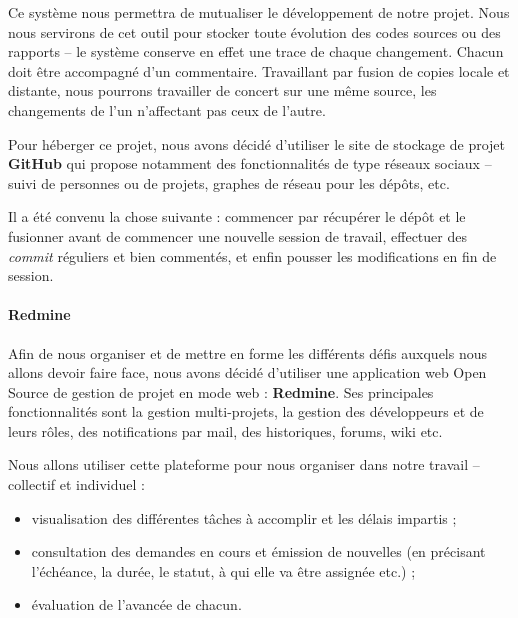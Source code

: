 
Ce système nous permettra de mutualiser le développement de notre projet. Nous nous servirons de cet outil pour stocker toute évolution des codes sources ou des rapports -- le système conserve en effet une trace de chaque changement. Chacun doit être accompagné d'un commentaire. Travaillant par fusion de copies locale et distante, nous pourrons travailler de concert sur une même source, les changements de l'un n'affectant pas ceux de l'autre.

Pour héberger ce projet, nous avons décidé d'utiliser le site de stockage de projet \textbf{GitHub} qui propose notamment des fonctionnalités de type réseaux sociaux -- suivi de personnes ou de projets, graphes de réseau pour les dépôts, etc.

Il a été convenu la chose suivante : commencer par récupérer le dépôt et le fusionner avant de commencer une nouvelle session de travail, effectuer des \textit{commit} réguliers et bien commentés, et enfin pousser les modifications en fin de session.

\paragraph*{Redmine\\}

Afin de nous organiser et de mettre en forme les différents défis auxquels nous allons devoir faire face, nous avons décidé d'utiliser une application web Open Source de gestion de projet en mode web : \textbf{Redmine}. Ses principales fonctionnalités sont la gestion multi-projets, la gestion des développeurs et de leurs rôles, des notifications par mail, des historiques, forums, wiki etc.

Nous allons utiliser cette plateforme pour nous organiser dans notre travail -- collectif et individuel :

\begin{itemize}
  \item visualisation des différentes tâches à accomplir et les délais impartis ;
  \item consultation des demandes en cours et émission de nouvelles (en précisant l'échéance, la durée, le statut, à qui elle va être assignée etc.) ;
  \item évaluation de l'avancée de chacun.
\end{itemize}


